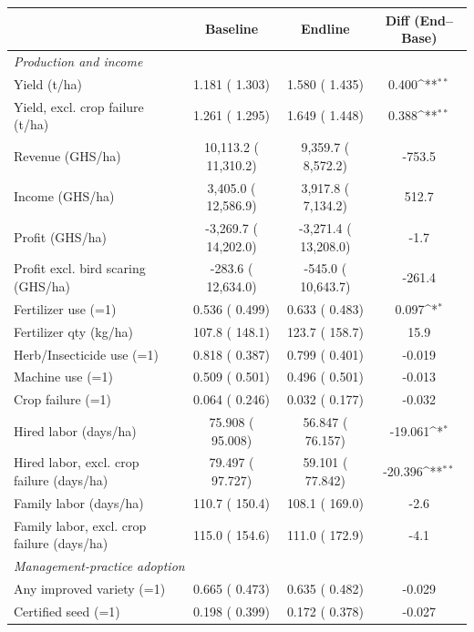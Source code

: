 \def\sym#1{\ifmmode^{#1}\else\(^{#1}\)\fi}
\begin{tabular}{lccc}
\toprule
 & Baseline & Endline & Diff (End--Base) \\
\midrule
\multicolumn{4}{l}{\textit{Production and income}}\\
Yield (t/ha) &     1.181 (    1.303) &     1.580 (    1.435) &     0.400\sym{**} \\
\quad Yield, excl. crop failure (t/ha) &     1.261 (    1.295) &     1.649 (    1.448) &     0.388\sym{**} \\
Revenue (GHS/ha) &     10,113.2 (    11,310.2) &      9,359.7 (     8,572.2) &       -753.5 \\
Income (GHS/ha) &      3,405.0 (    12,586.9) &      3,917.8 (     7,134.2) &        512.7 \\
Profit (GHS/ha) &     -3,269.7 (    14,202.0) &     -3,271.4 (    13,208.0) &         -1.7 \\
Profit excl. bird scaring (GHS/ha) &       -283.6 (    12,634.0) &       -545.0 (    10,643.7) &       -261.4 \\
Fertilizer use (=1) &     0.536 (    0.499) &     0.633 (    0.483) &     0.097\sym{*} \\
Fertilizer qty (kg/ha) &        107.8 (       148.1) &        123.7 (       158.7) &         15.9 \\
Herb/Insecticide use (=1) &     0.818 (    0.387) &     0.799 (    0.401) &    -0.019 \\
Machine use (=1) &     0.509 (    0.501) &     0.496 (    0.501) &    -0.013 \\
Crop failure (=1) &     0.064 (    0.246) &     0.032 (    0.177) &    -0.032 \\
Hired labor (days/ha) &    75.908 (   95.008) &    56.847 (   76.157) &   -19.061\sym{*} \\
\quad Hired labor, excl. crop failure (days/ha) &    79.497 (   97.727) &    59.101 (   77.842) &   -20.396\sym{**} \\
Family labor (days/ha) &        110.7 (       150.4) &        108.1 (       169.0) &         -2.6 \\
\quad Family labor, excl. crop failure (days/ha) &        115.0 (       154.6) &        111.0 (       172.9) &         -4.1 \\
\multicolumn{4}{l}{\textit{Management-practice adoption}}\\
Any improved variety (=1) &     0.665 (    0.473) &     0.635 (    0.482) &    -0.029 \\
Certified seed (=1) &     0.198 (    0.399) &     0.172 (    0.378) &    -0.027 \\

\end{tabular}
